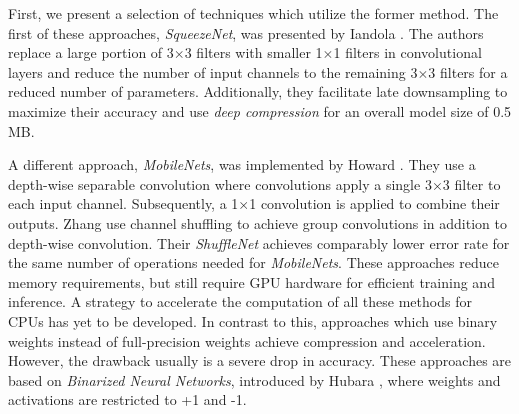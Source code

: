 \documentclass[10pt,twocolumn,letterpaper]{article}
\begin{document}

First, we present a selection of techniques which utilize the former method.
The first of these approaches, \emph{SqueezeNet}, was presented by Iandola \etal\cite{Iandola2016}.
The authors replace a large portion of 3$\times$3 filters with smaller 1$\times$1 filters in convolutional layers and reduce the number of input channels to the remaining 3$\times$3 filters for a reduced number of parameters.
Additionally, they facilitate late downsampling to maximize their accuracy and use \emph{deep compression}\cite{Han2015} for an overall model size of 0.5 MB.

A different approach, \emph{MobileNets}, was implemented by Howard \etal\cite{Howard2017}.
They use a depth-wise separable convolution where convolutions apply a single 3$\times$3 filter to each input channel.
Subsequently, a 1$\times$1 convolution is applied to combine their outputs.
Zhang \etal\cite{Zhang2017} use channel shuffling to achieve group convolutions in addition to depth-wise convolution.
Their \emph{ShuffleNet} achieves comparably lower error rate for the same number of operations needed for \emph{MobileNets}.
These approaches reduce memory requirements, but still require GPU hardware for efficient training and inference.
A strategy to accelerate the computation of all these methods for CPUs has yet to be developed.
In contrast to this, approaches which use binary weights instead of full-precision weights achieve compression and acceleration.
However, the drawback usually is a severe drop in accuracy.
These approaches are based on \emph{Binarized Neural Networks}, introduced by Hubara \etal\cite{Courbariaux2016}, where weights and activations are restricted to +1 and -1.
\end{document}
